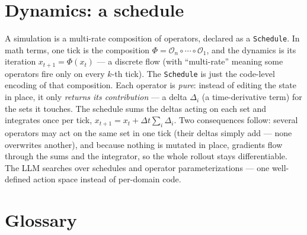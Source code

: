 \documentclass[11pt]{article}
\newcommand{\code}[1]{\texttt{#1}}
\begin{document}
\section{Dynamics: a schedule}
\label{sec:schedule}

A simulation is a multi-rate composition of operators, declared as a
\code{Schedule}. In math terms, one tick is the composition
$\Phi=\mathcal{O}_n\circ\cdots\circ\mathcal{O}_1$, and the dynamics is its
iteration $x_{t+1}=\Phi(x_t)$ --- a discrete flow (with ``multi-rate'' meaning
some operators fire only on every $k$-th tick). The \code{Schedule} is just the
code-level encoding of that composition. Each operator is \emph{pure}: instead of
editing the state in place, it only \emph{returns its contribution} --- a delta
$\Delta_i$ (a time-derivative term) for the sets it touches. The schedule sums the
deltas acting on each set and integrates once per tick,
$x_{t+1}=x_t+\Delta t\sum_i\Delta_i$. Two consequences follow: several operators may
act on the same set in one tick (their deltas simply add --- none overwrites
another), and because nothing is mutated in place, gradients flow through the sums
and the integrator, so the whole rollout stays differentiable. The LLM searches over
schedules and operator parameterizations --- one well-defined action space instead
of per-domain code.

\section{Glossary}
\end{document}
